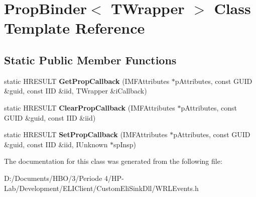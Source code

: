 \hypertarget{class_prop_binder}{}\section{Prop\+Binder$<$ T\+Wrapper $>$ Class Template Reference}
\label{class_prop_binder}
\subsection*{Static Public Member Functions}
\begin{DoxyCompactItemize}
\item 
\mbox{\label{class_prop_binder_aa99b464463904106b3a9c072121caae3}} 
static H\+R\+E\+S\+U\+LT {\bfseries Get\+Prop\+Callback} (I\+M\+F\+Attributes $\ast$p\+Attributes, const G\+U\+ID \&guid, const I\+ID \&iid, T\+Wrapper \&i\+Callback)
\item 
\mbox{\label{class_prop_binder_a53f85626a715d8407b361604b44489d4}} 
static H\+R\+E\+S\+U\+LT {\bfseries Clear\+Prop\+Callback} (I\+M\+F\+Attributes $\ast$p\+Attributes, const G\+U\+ID \&guid, const I\+ID \&iid)
\item 
\mbox{\label{class_prop_binder_aa12f7d870a386a4b904bae1550a6322f}} 
static H\+R\+E\+S\+U\+LT {\bfseries Set\+Prop\+Callback} (I\+M\+F\+Attributes $\ast$p\+Attributes, const G\+U\+ID \&guid, const I\+ID \&iid, I\+Unknown $\ast$sp\+Insp)
\end{DoxyCompactItemize}


The documentation for this class was generated from the following file\+:\begin{DoxyCompactItemize}
\item 
D\+:/\+Documents/\+H\+B\+O/3/\+Periode 4/\+H\+P-\/\+Lab/\+Development/\+E\+L\+I\+Client/\+Custom\+Eli\+Sink\+Dll/W\+R\+L\+Events.\+h\end{DoxyCompactItemize}
